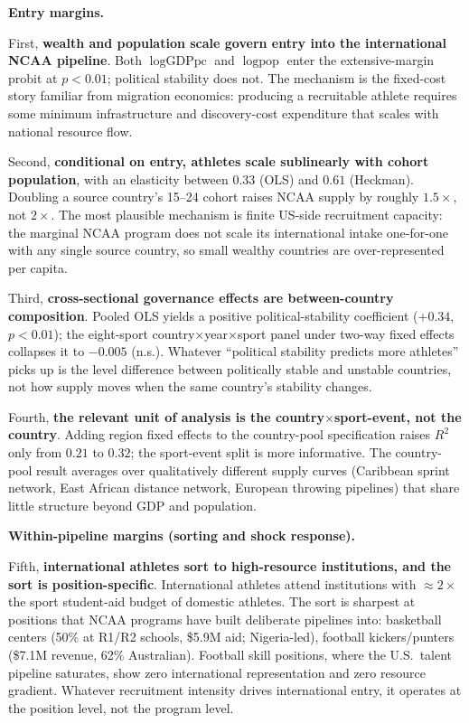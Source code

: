 \documentclass[11pt]{article}
\begin{document}
\textbf{Entry margins.}

First, \textbf{wealth and population scale govern entry into the
international NCAA pipeline}. Both $\log\text{GDPpc}$ and
$\log\text{pop}$ enter the extensive-margin probit at $p<0.01$;
political stability does not. The mechanism is the fixed-cost story
familiar from migration economics: producing a recruitable athlete
requires some minimum infrastructure and discovery-cost expenditure
that scales with national resource flow.

Second, \textbf{conditional on entry, athletes scale sublinearly
with cohort population}, with an elasticity between $0.33$ (OLS) and
$0.61$ (Heckman). Doubling a source country's 15--24 cohort raises
NCAA supply by roughly $1.5\times$, not $2\times$. The most plausible
mechanism is finite US-side recruitment capacity: the marginal NCAA
program does not scale its international intake one-for-one with any
single source country, so small wealthy countries are
over-represented per capita.

Third, \textbf{cross-sectional governance effects are
between-country composition}. Pooled OLS yields a positive
political-stability coefficient ($+0.34$, $p<0.01$); the eight-sport
country${\times}$year${\times}$sport panel under two-way fixed effects
collapses it to $-0.005$ (n.s.). Whatever ``political stability
predicts more athletes'' picks up is the level difference between
politically stable and unstable countries, not how supply moves when
the same country's stability changes.

Fourth, \textbf{the relevant unit of analysis is the
country${\times}$sport-event, not the country}. Adding region fixed
effects to the country-pool specification raises $R^2$ only from
$0.21$ to $0.32$; the sport-event split is more informative. The
country-pool result averages over qualitatively different supply
curves (Caribbean sprint network, East African distance network,
European throwing pipelines) that share little structure beyond GDP
and population.

\textbf{Within-pipeline margins (sorting and shock response).}

Fifth, \textbf{international athletes sort to high-resource
institutions, and the sort is position-specific}. International
athletes attend institutions with $\approx 2\times$ the sport
student-aid budget of domestic athletes. The sort is sharpest at
positions that NCAA programs have built deliberate pipelines into:
basketball centers (50\% at R1/R2 schools, \$5.9M aid; Nigeria-led),
football kickers/punters (\$7.1M revenue, 62\% Australian).
Football skill positions, where the U.S.\ talent pipeline
saturates, show zero international representation and zero
resource gradient. Whatever recruitment intensity drives
international entry, it operates at the position level, not the
program level.
\end{document}
